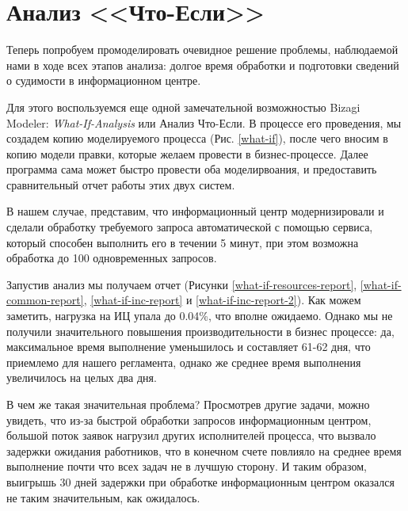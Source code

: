\chapter{Анализ <<Что-Если>>}

Теперь попробуем промоделировать очевидное решение проблемы,
наблюдаемой нами в ходе всех этапов анализа: долгое время
обработки и подготовки сведений о судимости в информационном центре.

Для этого воспользуемся еще одной замечательной возможностью
Bizagi Modeler: \textit{What-If-Analysis} или Анализ Что-Если.
В процессе его проведения, мы создадем копию моделируемого
процесса (Рис. \ref{what-if}), после чего вносим в копию
модели правки, которые желаем провести в бизнес-процессе.
Далее программа сама может быстро провести оба моделирвоания,
и предоставить сравнительный отчет работы этих двух систем.

В нашем случае, представим, что информационный центр
модернизировали и сделали обработку требуемого запроса
автоматической с помощью сервиса, который способен выполнить
его в течении 5 минут, при этом возможна обработка до 100
одновременных запросов.

Запустив анализ мы получаем отчет (Рисунки
\ref{what-if-resources-report},
\ref{what-if-common-report},
\ref{what-if-inc-report} и
\ref{what-if-inc-report-2}). Как можем заметить, нагрузка на
ИЦ упала до 0.04\%, что вполне ожидаемо. Однако мы не
получили значительного повышения производительности в бизнес
процессе: да, максимальное время выполнение уменьшилось и
составляет 61-62 дня, что приемлемо для нашего регламента,
однако же среднее время выполнения увеличилось на целых два
дня.

В чем же такая значительная проблема? Просмотрев другие задачи,
можно увидеть, что из-за быстрой обработки запросов
информационным центром, большой поток заявок нагрузил других
исполнителей процесса, что вызвало задержки ожидания работников,
что в конечном счете повлияло на среднее время выполнение почти
что всех задач не в лучшую сторону. И таким образом,
выигрышь 30 дней задержки при обработке информационным центром
оказался не таким значительным, как ожидалось.



